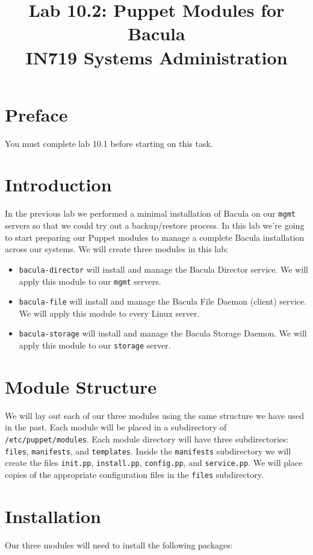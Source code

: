 \documentclass{article}   	%
\title{Lab 10.2:  Puppet Modules for Bacula\\ IN719 Systems Administration}
\date{}							%
\begin{document}
\maketitle

\section*{Preface}
You must complete lab 10.1 before starting on this task. 

\section*{Introduction}
In the previous lab we performed a minimal installation of Bacula on our \texttt{mgmt} servers so that we could try out a backup/restore process. In this lab we're going to start preparing our Puppet modules to manage a complete Bacula installation across our systems. We will create three modules in this lab:

\begin{itemize}
	\item \texttt{bacula-director} will install and manage the Bacula Director service.  We will apply this module to our \texttt{mgmt} servers.
	\item \texttt{bacula-file} will install and manage the Bacula File Daemon (client) service. We will apply this module to every Linux server.
	\item \texttt{bacula-storage} will install and manage the Bacula Storage Daemon.  We will apply this module to our \texttt{storage} server.
\end{itemize}

\section{Module Structure}
We will lay out each of our three modules using the same structure we have used in the past.  Each module will be placed in a subdirectory of \texttt{/etc/puppet/modules}.  Each module directory will have three subdirectories: \texttt{files}, \texttt{manifests}, and \texttt{templates}.  Inside the \texttt{manifests} subdirectory we will create the files \texttt{init.pp}, \texttt{install.pp}, \texttt{config.pp}, and \texttt{service.pp}. We will place copies of the appropriate configuration files in the \texttt{files} subdirectory.

\section{Installation}
Our three modules will need to install the following packages:
\end{document}
